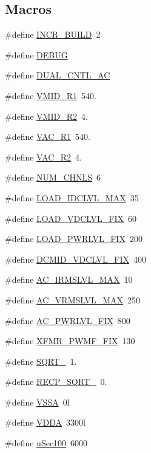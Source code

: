\subsection*{Macros}
\begin{DoxyCompactItemize}
\item 
\#define \hyperlink{a00043_abf493281a7e64fe88660c38753e18d56}{I\-N\-C\-R\-\_\-\-B\-U\-I\-L\-D}~2
\item 
\#define \hyperlink{a00043_ad72dbcf6d0153db1b8d8a58001feed83}{D\-E\-B\-U\-G}
\item 
\#define \hyperlink{a00043_a600b96e7a1d3cd28e228833bb61f8074}{D\-U\-A\-L\-\_\-\-C\-N\-T\-L\-\_\-\-A\-C}
\item 
\#define \hyperlink{a00043_a511faa1530ba984d340a884a97e6a80a}{V\-M\-I\-D\-\_\-\-R1}~540.
\item 
\#define \hyperlink{a00043_a86d7f47e3c125143c21e1ca2836eb4ab}{V\-M\-I\-D\-\_\-\-R2}~4.
\item 
\#define \hyperlink{a00043_a67fad1f78c49251e39fa6f1d5ff43e9e}{V\-A\-C\-\_\-\-R1}~540.
\item 
\#define \hyperlink{a00043_a087778c4195e73f588e5c3cf7d9e9206}{V\-A\-C\-\_\-\-R2}~4.
\item 
\#define \hyperlink{a00043_afe433b138bb71d8d26b6e0907e656d1b}{N\-U\-M\-\_\-\-C\-H\-N\-L\-S}~6
\item 
\#define \hyperlink{a00043_a1dd2b3b31e620e021371603376c6980f}{L\-O\-A\-D\-\_\-\-I\-D\-C\-L\-V\-L\-\_\-\-M\-A\-X}~35
\item 
\#define \hyperlink{a00043_ac460f1e706fdf51002f5dfc15c8eb5c9}{L\-O\-A\-D\-\_\-\-V\-D\-C\-L\-V\-L\-\_\-\-F\-I\-X}~60
\item 
\#define \hyperlink{a00043_aea1e2f7c212899b68d0cb6f4fcd1683d}{L\-O\-A\-D\-\_\-\-P\-W\-R\-L\-V\-L\-\_\-\-F\-I\-X}~200
\item 
\#define \hyperlink{a00043_ad873d002fba2a43978755cfb5e9ad5ee}{D\-C\-M\-I\-D\-\_\-\-V\-D\-C\-L\-V\-L\-\_\-\-F\-I\-X}~400
\item 
\#define \hyperlink{a00043_a2b577413184eb560f2f652b11deeba87}{A\-C\-\_\-\-I\-R\-M\-S\-L\-V\-L\-\_\-\-M\-A\-X}~10
\item 
\#define \hyperlink{a00043_afb09d50c3567117fe1f679ab1924d4ec}{A\-C\-\_\-\-V\-R\-M\-S\-L\-V\-L\-\_\-\-M\-A\-X}~250
\item 
\#define \hyperlink{a00043_aa5433ef3bc07259bf870e6e5e115c693}{A\-C\-\_\-\-P\-W\-R\-L\-V\-L\-\_\-\-F\-I\-X}~800
\item 
\#define \hyperlink{a00043_a39c57f59314d3cc076ca98898f227b46}{X\-F\-M\-R\-\_\-\-P\-W\-M\-F\-\_\-\-F\-I\-X}~130
\item 
\#define \hyperlink{a00043_abc63ab2a8e7782de38a5dbdfc33da717}{S\-Q\-R\-T\-\_}~1.
\item 
\#define \hyperlink{a00043_ae468f418f2e6410dfcfeb58bcbbde516}{R\-E\-C\-P\-\_\-\-S\-Q\-R\-T\-\_}~0.
\item 
\#define \hyperlink{a00043_a3c2e957a61cfa19e31e8477fe3aacab8}{V\-S\-S\-A}~0l
\item 
\#define \hyperlink{a00043_a2d52976aedaedf74a90019a689170620}{V\-D\-D\-A}~3300l
\item 
\#define \hyperlink{a00043_aa010c11f88da0f9a48a7dfd810412d5d}{u\-Sec100}~6000
\end{DoxyCompactItemize}
